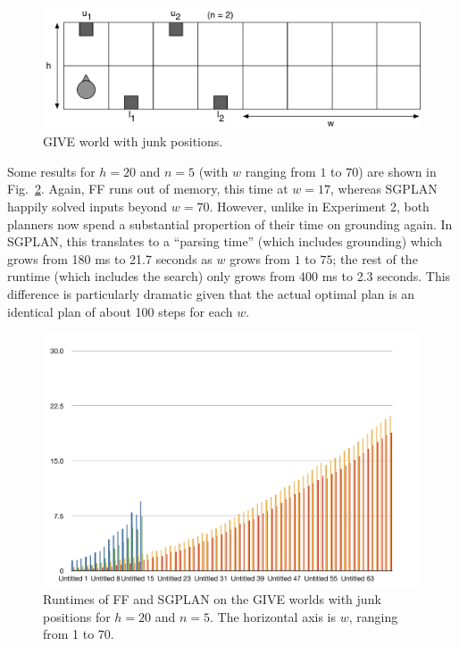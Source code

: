 \begin{figure}
  \centering
  \includegraphics[width=1\columnwidth]{pic-empty-buttons}
  \caption{GIVE world with junk positions.}
  \label{fig:give-junk}
\end{figure}

Some results for $h=20$ and $n=5$ (with $w$ ranging from $1$ to $70$)
are shown in Fig.~\ref{fig:give-runtime-junk}.  Again, FF runs out of
memory, this time at $w=17$, whereas SGPLAN happily solved inputs
beyond $w=70$.  However, unlike in Experiment 2, both planners now
spend a substantial propertion of their time on grounding again.  In
SGPLAN, this translates to a ``parsing time'' (which
 includes grounding) which grows from 180 ms to 21.7
seconds as $w$ grows from $1$ to $75$; the rest of the runtime (which
includes the search) only grows from 400 ms to 2.3 seconds.  This
difference is particularly dramatic given that the actual optimal plan
is an identical plan of about 100 steps for each $w$.

\begin{figure}
  \centering
  \includegraphics[width=1\columnwidth]{pic-runtime-empty-world}
  \caption{Runtimes of FF and SGPLAN on the GIVE worlds with junk
    positions for $h=20$ and $n=5$. The horizontal axis is $w$,
    ranging from 1 to 70.}
  \label{fig:give-runtime-junk}
\end{figure}


